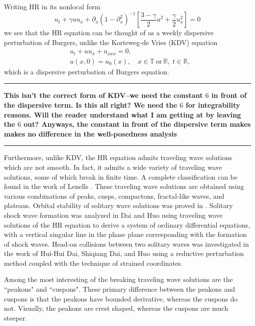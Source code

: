 \documentclass[12pt,reqno]{amsart}
\newcommand{\rr}{\mathbb{R}}
\newcommand{\ci}{\mathbb{T}}
\newcommand{\p}{\partial}
\begin{document}
Writing HR in its nonlocal form
$$
u_{t} + \gamma u u_{x}+ \p_{x} (1 - \p_{x}^{2})^{-1} \left [ \frac{3 - \gamma}{2}u^{2} + \frac{\gamma}{2} u_{x}^{2} \right ]=0
$$
we see that the HR equation can be thought of as a 
weekly dispersive perturbation of
Burgers, unlike the Korteweg-de Vries (KDV) equation
\begin{align}
    & u_{t} + u u_{x} + u_{xxx}=0,
    \\
& u(x, 0) = u_0 (x), \quad x  \in \ci \ \text{or} \  \rr, \ t \in \rr,
\end{align}
which is a dispersive perturbation of Burgers equation.
\hrule
\textbf{This isn't the correct form of KDV--we need the constant $6$ in front of the dispersive term. Is this all right? We
need the $6$ for integrability reasons. Will the reader understand what I am getting at by leaving the $6$ out?
Anyways, the constant in front of the dispersive term makes makes no difference
in the well-posedness analysis}
\hrule
Furthermore, unlike KDV,
the HR equation admits traveling wave solutions which are not smooth. In fact,
it admits a wide variety of traveling wave solutions, some of which break in
finite time. A complete classification can be found in the work of Lenells
\cite{Lenells_2006_Traveling-waves}.  These traveling wave solutions are
obtained using various combinations of peaks, cusps, compactons, fractal-like
waves, and plateaus. Orbital stability of solitary wave solutions was proved in
\cite{Constantin_2000_Stability-of-a-}.  Solitary shock wave formation was
analyzed in Dai and Huo \cite{Dai_2000_Solitary-shock-} using traveling wave
solutions of the HR equation to derive a system of ordinary differential
equations, with a vertical singular line in the phase plane corresponding with
the formation of shock waves. Head-on collisions between two solitary waves was
investigated in the work of Hui-Hui Dai, Shiqiang Dai, and Huo
\cite{Dai_2000_Head-on-collisi} using a reductive perturbation method coupled
with the technique of strained coordinates. 

Among the most interesting of the breaking
traveling wave solutions are the ``peakons" and
``cuspons". These primary difference between the peakons and cuspons is that the
peakons have bounded derivative, whereas the cuspons do not. Visually, the
peakons are crest shaped, whereas the cuspons are much steeper. 
\end{document}

